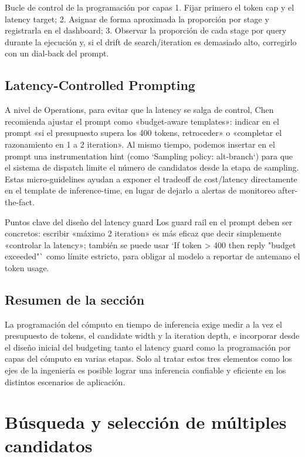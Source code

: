 \documentclass[a4paper]{article}
\begin{document}
\begin{knowledgebox}{Bucle de control de la programación por capas}
1. Fijar primero el token cap y el latency target; 2. Asignar de forma aproximada la proporción por stage y registrarla en el dashboard; 3. Observar la proporción de cada stage por query durante la ejecución y, si el drift de search/iteration es demasiado alto, corregirlo con un dial-back del prompt.
\end{knowledgebox}

\subsection{Latency-Controlled Prompting}
A nivel de Operations, para evitar que la latency se salga de control, Chen recomienda ajustar el prompt como «budget-aware templates»: indicar en el prompt «si el presupuesto supera los 400 tokens, retroceder» o «completar el razonamiento en 1 a 2 iteration». Al mismo tiempo, podemos insertar en el prompt una instrumentation hint (como `Sampling policy: alt-branch`) para que el sistema de dispatch limite el número de candidatos desde la etapa de sampling. Estas micro-guidelines ayudan a exponer el tradeoff de cost/latency directamente en el template de inference-time, en lugar de dejarlo a alertas de monitoreo after-the-fact.

\begin{warningbox}{Puntos clave del diseño del latency guard}
Los guard rail en el prompt deben ser concretos: escribir «máximo 2 iteration» es más eficaz que decir simplemente «controlar la latency»; también se puede usar `If token > 400 then reply "budget exceeded"` como límite estricto, para obligar al modelo a reportar de antemano el token usage.
\end{warningbox}

\subsection{Resumen de la sección}
La programación del cómputo en tiempo de inferencia exige medir a la vez el presupuesto de tokens, el candidate width y la iteration depth, e incorporar desde el diseño inicial del budgeting tanto el latency guard como la programación por capas del cómputo en varias etapas. Solo al tratar estos tres elementos como los ejes de la ingeniería es posible lograr una inferencia confiable y eficiente en los distintos escenarios de aplicación.
\section{Búsqueda y selección de múltiples candidatos}
\end{document}
